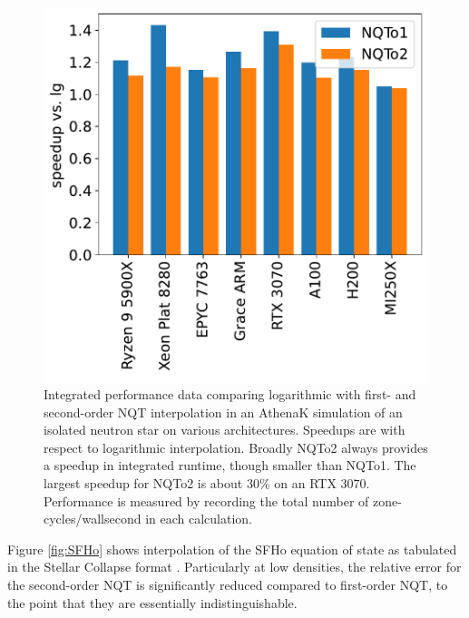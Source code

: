 \documentclass[linenumbers,twocolumn]{aastex631}
\begin{document}
\begin{figure}[tb]
    \centering
    \includegraphics[width=0.99\columnwidth]{figures/athenak_speedups.pdf}
    \caption{Integrated performance data comparing logarithmic with first- and second-order NQT interpolation in an AthenaK simulation of an isolated neutron star on various architectures. Speedups are with respect to logarithmic interpolation. Broadly NQTo2 always provides a speedup in integrated runtime, though smaller than NQTo1. The largest speedup for NQTo2 is about 30\% on an RTX 3070. Performance is measured by recording the total number of zone-cycles/wallsecond in each calculation.}
    \label{fig:TOV:perf}
\end{figure}

Figure \ref{fig:SFHo} shows interpolation of the SFHo \citep{SFHoEOS} equation of state as tabulated in the Stellar Collapse format \cite{stellarcollapsetables}. Particularly at low densities, the relative error for the second-order NQT is significantly reduced compared to first-order NQT, to the point that they are essentially indistinguishable. 
\end{document}
